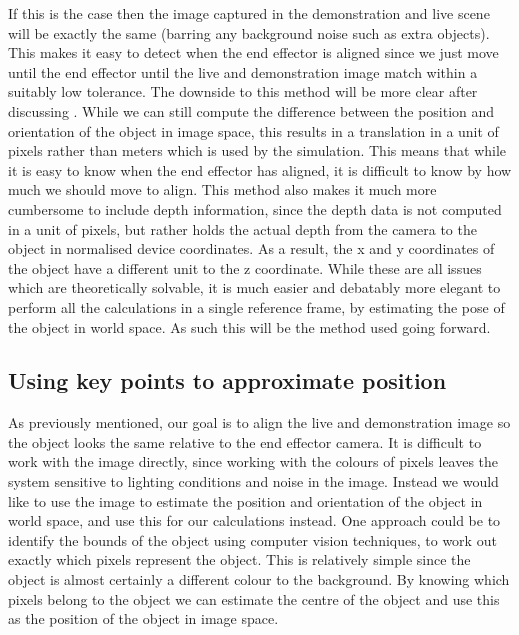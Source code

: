 If this is the case then the image captured in the demonstration and live scene will be exactly the same (barring any background noise such as extra objects). This makes it easy to detect when the end effector is aligned since we just move until the end effector until the live and demonstration image match within a suitably low tolerance. The downside to this method will be more clear after discussing . While we can still compute the difference between the position and orientation of the object in image space, this results in a translation in a unit of pixels rather than meters which is used by the simulation. This means that while it is easy to know when the end effector has aligned, it is difficult to know by how much we should move to align. This method also makes it much more cumbersome to include depth information, since the depth data is not computed in a unit of pixels, but rather holds the actual depth from the camera to the object in normalised device coordinates. As a result, the x and y coordinates of the object have a different unit to the z coordinate. While these are all issues which are theoretically solvable, it is much easier and debatably more elegant to perform all the calculations in a single reference frame, by estimating the pose of the object in world space. As such this will be the method used going forward.


\subsection{Using key points to approximate position}
\label{subsec:keypoints}
As previously mentioned, our goal is to align the live and demonstration image so the object looks the same relative to the end effector camera. It is difficult to work with the image directly, since working with the colours of pixels leaves the system sensitive to lighting conditions and noise in the image. Instead we would like to use the image to estimate the position and orientation of the object in world space, and use this for our calculations instead. One approach could be to identify the bounds of the object using computer vision techniques, to work out exactly which pixels represent the object. This is relatively simple since the object is almost certainly a different colour to the background. By knowing which pixels belong to the object we can estimate the centre of the object and use this as the position of the object in image space.\\

